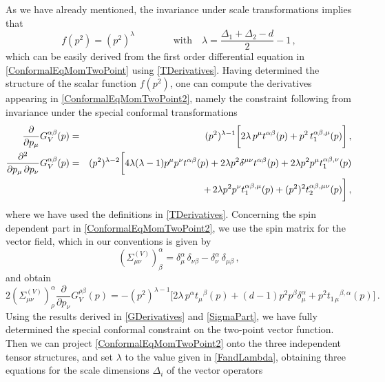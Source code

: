 \documentclass[a4paper,11pt,openright,twoside]{book}
\numberwithin{equation}{section}
\begin{document}
%
As we have already mentioned, the invariance under scale transformations implies that
\begin{equation}
	\label{FandLambda}
	f(p^2) = (p^2)^\lambda \qquad \qquad \mbox{with} \quad \lambda = \frac{\Delta_1 + \Delta_2 - d}{2} -1 \,,
\end{equation}
which can be easily derived from the first order differential equation in \eqref{ConformalEqMomTwoPoint} using \eqref{TDerivatives}. Having determined the structure of the scalar function $f(p^2)$, one can compute the derivatives appearing in \eqref{ConformalEqMomTwoPoint2}, namely the constraint following from invariance under the special conformal transformations
\begin{eqnarray}
	\label{GDerivatives}
	\frac{\partial}{\partial p_\mu} G_V^{\alpha \beta}(p) &=& (p^2)^{\lambda - 1} \bigg[ 2 \lambda \, p^\mu t^{\alpha \beta}(p) + p^2 \, t_1^{\alpha\beta, \mu}(p) \bigg] \,, \notag \\
	\frac{\partial^2}{\partial p_\mu \, \partial p_\nu} G_V^{\alpha \beta}(p) &=&(p^2)^{\lambda - 2} \bigg[ 4 \lambda (\lambda -1) p^{\mu} p^{\nu} t^{\alpha \beta}(p)  + 2 \lambda p^2 \delta^{\mu\nu}   t^{\alpha \beta}(p) + 2 \lambda  p^2 p^{\mu} t_1^{\alpha\beta,\nu}(p)  \notag \\
	&& \qquad +  \, 2 \lambda  p^2 p^{\nu} t_1^{\alpha\beta,\mu}(p) + (p^2)^2 t_2^{\alpha\beta, \mu\nu}(p) 
	\bigg] \,,
\end{eqnarray}
where we have used the definitions in \eqref{TDerivatives}.
Concerning the spin dependent part in \eqref{ConformalEqMomTwoPoint2}, we use the spin matrix for the vector field, which in our conventions is given by
\begin{equation}
	( \Sigma_{\mu\nu}^{(V)})^{\alpha}_{\beta} = \delta_{\mu}^{\alpha} \, \delta_{\nu \beta} - \delta_{\nu}^{\alpha} \, \delta_{\mu \beta} \,,
\end{equation}
and obtain
\begin{equation}
	\label{SigmaPart}
	2( \Sigma_{\mu\nu}^{(V)})^{\alpha}_{\rho} \frac{\partial}{\partial p_\nu} G_V^{\rho\beta}(p) = - (p^2)^{\lambda- 1} \bigg[ 2 \lambda \, p^\alpha {t_{\mu}}^{\beta}(p) + (d-1)p^2 p^\beta \delta_\mu^\alpha  + p^2 {t_{1 \, \mu}}^{\beta, \alpha}(p) \bigg] \,.
\end{equation}
%
Using the results derived in \eqref{GDerivatives} and \eqref{SigmaPart}, we have fully determined the special conformal constraint on the two-point vector function.
Then we can project \eqref{ConformalEqMomTwoPoint2} onto the three independent tensor structures, and set $\lambda$ to the value given in \eqref{FandLambda}, obtaining three equations for the scale dimensions $\Delta_i$ of the vector operators
\end{document}
